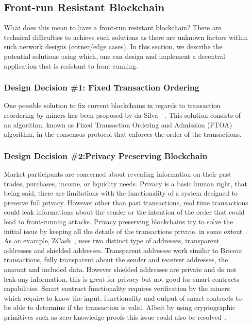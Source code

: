 \subsection{Front-run Resistant Blockchain}
What does this mean to have a front-run resistant blockchain?  There are technical difficulties to achieve such solutions as there are unknown factors within such network designs (corner/edge cases). In this section, we describe the potential solutions using which, one can design and implement a decentral application that is resistant to front-running.

\subsubsection{Design Decision \#1: Fixed Transaction Ordering\newline}

One possible solution to fix current blockchains in regards to transaction reordering by miners has been proposed by da Silva~\etal~\cite{fixedordering2018silva}. This solution consists of an algorithm, known as Fixed Transaction Ordering and Admission (FTOA) algorithm, in the consensus protocol that enforces the order of the transactions. 

\subsubsection{Design Decision \#2:Privacy Preserving Blockchain\newline}

Market participants are concerned about revealing information on their past trades, purchases, income, or liquidity needs. Privacy is a basic human right, that being said, there are limitations with the functionality of a system designed to preserve full privacy. However other than past transactions, real time transactions could leak informations about the sender or the intention of the order that could lead to front-running attacks. Privacy preserving blockchains try to solve the initial issue by keeping all the details of the transactions private, in some extent~\cite{miller2017empirical, kappos2018empirical}. 
As an example, ZCash~\cite{hopwood2016zcash}, uses two distinct type of addresses, transparent addresses and shielded addresses. Transparent addresses work similar to Bitcoin transactions, fully transparent about the sender and receiver addresses, the amount and included data. However shielded addresses are private and do not leak any information, this is great for privacy but not good for smart contracts capabilities. Smart contract functionality requires verification by the miners which require to know the input, functionality and output of smart contracts to be able to determine if the transaction is valid. Albeit by using cryptographic primitives such as zero-knowledge proofs this issue could also be resolved~\cite{kosba2016hawk}. 



